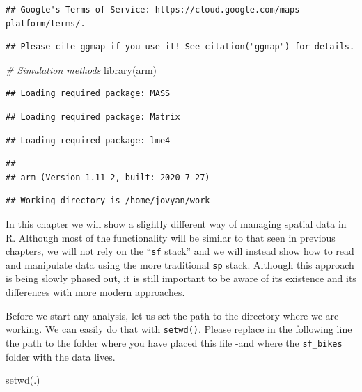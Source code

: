 \documentclass[
]{book}
\newenvironment{Shaded}{\begin{snugshade}}{\end{snugshade}}
\newcommand{\CommentTok}[1]{\textcolor[rgb]{0.56,0.35,0.01}{\textit{#1}}}
\newcommand{\FunctionTok}[1]{\textcolor[rgb]{0.00,0.00,0.00}{#1}}
\newcommand{\NormalTok}[1]{#1}
\newcommand{\StringTok}[1]{\textcolor[rgb]{0.31,0.60,0.02}{#1}}
\begin{document}
\begin{verbatim}
## Google's Terms of Service: https://cloud.google.com/maps-platform/terms/.
\end{verbatim}

\begin{verbatim}
## Please cite ggmap if you use it! See citation("ggmap") for details.
\end{verbatim}

\begin{Shaded}
\begin{Highlighting}[]
\CommentTok{\# Simulation methods}
\FunctionTok{library}\NormalTok{(arm)}
\end{Highlighting}
\end{Shaded}

\begin{verbatim}
## Loading required package: MASS
\end{verbatim}

\begin{verbatim}
## Loading required package: Matrix
\end{verbatim}

\begin{verbatim}
## Loading required package: lme4
\end{verbatim}

\begin{verbatim}
## 
## arm (Version 1.11-2, built: 2020-7-27)
\end{verbatim}

\begin{verbatim}
## Working directory is /home/jovyan/work
\end{verbatim}

In this chapter we will show a slightly different way of managing spatial data in R. Although most of the functionality will be similar to that seen in previous chapters, we will not rely on the ``\texttt{sf} stack'' and we will instead show how to read and manipulate data using the more traditional \texttt{sp} stack. Although this approach is being slowly phased out, it is still important to be aware of its existence and its differences with more modern approaches.

Before we start any analysis, let us set the path to the directory where we are working. We can easily do that with \texttt{setwd()}. Please replace in the following line the path to the folder where you have placed this file -and where the \texttt{sf\_bikes} folder with the data lives.

\begin{Shaded}
\begin{Highlighting}[]
\FunctionTok{setwd}\NormalTok{(}\StringTok{\textquotesingle{}.\textquotesingle{}}\NormalTok{)}
\end{Highlighting}
\end{Shaded}
\end{document}
